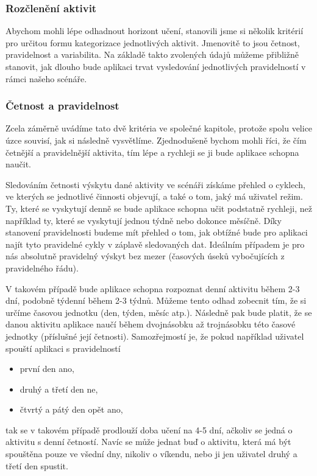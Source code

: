 \documentclass[thesis=M,czech]{FITthesis}[2012/06/26]
\begin{document}
\subsubsection*{Rozčlenění aktivit}
Abychom mohli lépe odhadnout horizont učení, stanovili jsme si několik kritérií pro určitou formu kategorizace jednotlivých aktivit. Jmenovitě to jsou četnost, pravidelnost a variabilita. Na základě takto zvolených údajů můžeme přibližně stanovit, jak dlouho bude aplikaci trvat vysledování jednotlivých pravidelností v rámci našeho scénáře.

\subsubsection*{Četnost a pravidelnost}
Zcela záměrně uvádíme tato dvě kritéria ve společné kapitole, protože spolu velice úzce souvisí, jak si následně vysvětlíme. Zjednodušeně bychom mohli říci, že čím četnější a pravidelnější aktivita, tím lépe a rychleji se ji bude aplikace schopna naučit.

Sledováním četnosti výskytu dané aktivity ve scénáři získáme přehled o cyklech, ve kterých se jednotlivé činnosti objevují, a také o tom, jaký má uživatel režim. Ty, které se vyskytují denně se bude aplikace schopna učit podstatně rychleji, než například ty, které se vyskytují jednou týdně nebo dokonce měsíčně. Díky stanovení pravidelnosti budeme mít přehled o tom, jak obtížné bude pro aplikaci najít tyto pravidelné cykly v záplavě sledovaných dat. Ideálním případem je pro nás absolutně pravidelný výskyt bez mezer (časových úseků vybočujících z pravidelného řádu).

V takovém případě bude aplikace schopna rozpoznat denní aktivitu během 2-3 dní, podobně týdenní během 2-3 týdnů. Můžeme tento odhad zobecnit tím, že si určíme časovou jednotku (den, týden, měsíc atp.). Následně pak bude platit, že se danou aktivitu aplikace naučí během dvojnásobku až trojnásobku této časové jednotky (příslušné její četnosti). Samozřejmostí je, že pokud například uživatel spouští aplikaci s pravidelností

\begin{itemize}
\item první den ano,
\item druhý a třetí den ne,
\item čtvrtý a pátý den opět ano,
\end{itemize}

tak se v takovém případě prodlouží doba učení na 4-5 dní, ačkoliv se jedná o aktivitu s denní četností. Navíc se může jednat buď o aktivitu, která má být spouštěna pouze ve všední dny, nikoliv o víkendu, nebo ji jen uživatel  druhý a třetí den spustit.
\end{document}
